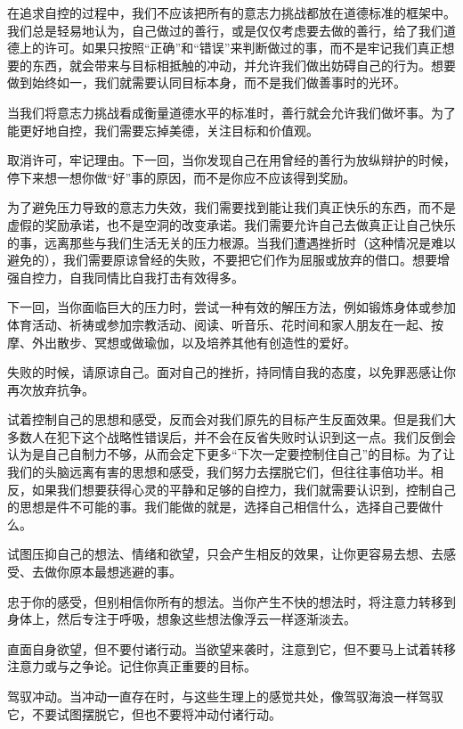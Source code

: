 \documentclass[12pt,oneside]{book}
\begin{document}
在追求自控的过程中，我们不应该把所有的意志力挑战都放在道德标准的框架中。我们总是轻易地认为，自己做过的善行，或是仅仅考虑要去做的善行，给了我们道德上的许可。如果只按照“正确”和“错误”来判断做过的事，而不是牢记我们真正想要的东西，就会带来与目标相抵触的冲动，并允许我们做出妨碍自己的行为。想要做到始终如一，我们就需要认同目标本身，而不是我们做善事时的光环。

当我们将意志力挑战看成衡量道德水平的标准时，善行就会允许我们做坏事。为了能更好地自控，我们需要忘掉美德，关注目标和价值观。

取消许可，牢记理由。下一回，当你发现自己在用曾经的善行为放纵辩护的时候，停下来想一想你做“好”事的原因，而不是你应不应该得到奖励。

为了避免压力导致的意志力失效，我们需要找到能让我们真正快乐的东西，而不是虚假的奖励承诺，也不是空洞的改变承诺。我们需要允许自己去做真正让自己快乐的事，远离那些与我们生活无关的压力根源。当我们遭遇挫折时（这种情况是难以避免的），我们需要原谅曾经的失败，不要把它们作为屈服或放弃的借口。想要增强自控力，自我同情比自我打击有效得多。

下一回，当你面临巨大的压力时，尝试一种有效的解压方法，例如锻炼身体或参加体育活动、祈祷或参加宗教活动、阅读、听音乐、花时间和家人朋友在一起、按摩、外出散步、冥想或做瑜伽，以及培养其他有创造性的爱好。

失败的时候，请原谅自己。面对自己的挫折，持同情自我的态度，以免罪恶感让你再次放弃抗争。

试着控制自己的思想和感受，反而会对我们原先的目标产生反面效果。但是我们大多数人在犯下这个战略性错误后，并不会在反省失败时认识到这一点。我们反倒会认为是自己自制力不够，从而会定下更多“下次一定要控制住自己”的目标。为了让我们的头脑远离有害的思想和感受，我们努力去摆脱它们，但往往事倍功半。相反，如果我们想要获得心灵的平静和足够的自控力，我们就需要认识到，控制自己的思想是件不可能的事。我们能做的就是，选择自己相信什么，选择自己要做什么。

试图压抑自己的想法、情绪和欲望，只会产生相反的效果，让你更容易去想、去感受、去做你原本最想逃避的事。

忠于你的感受，但别相信你所有的想法。当你产生不快的想法时，将注意力转移到身体上，然后专注于呼吸，想象这些想法像浮云一样逐渐淡去。

直面自身欲望，但不要付诸行动。当欲望来袭时，注意到它，但不要马上试着转移注意力或与之争论。记住你真正重要的目标。

驾驭冲动。当冲动一直存在时，与这些生理上的感觉共处，像驾驭海浪一样驾驭它，不要试图摆脱它，但也不要将冲动付诸行动。
\end{document}

